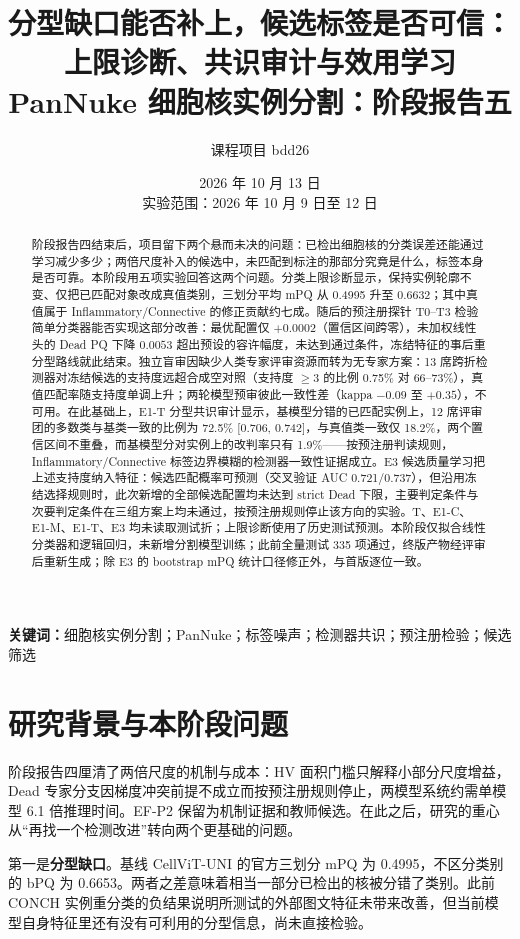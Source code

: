 \documentclass[11pt,a4paper,UTF8,fontset=fandol]{ctexart}
\title{\bfseries 分型缺口能否补上，候选标签是否可信：上限诊断、共识审计与效用学习\\[7pt]
\large PanNuke 细胞核实例分割：阶段报告五}
\author{课程项目 bdd26}
\date{2026 年 10 月 13 日\\\small 实验范围：2026 年 10 月 9 日至 12 日}
\begin{document}
\maketitle

\begin{abstract}
阶段报告四结束后，项目留下两个悬而未决的问题：已检出细胞核的分类误差还能通过学习减少多少；两倍尺度补入的候选中，未匹配到标注的那部分究竟是什么，标签本身是否可靠。本阶段用五项实验回答这两个问题。分类上限诊断显示，保持实例轮廓不变、仅把已匹配对象改成真值类别，三划分平均 mPQ 从 0.4995 升至 0.6632；其中真值属于 Inflammatory/Connective 的修正贡献约七成。随后的预注册探针 T0--T3 检验简单分类器能否实现这部分改善：最优配置仅 $+0.0002$（置信区间跨零），未加权线性头的 Dead PQ 下降 $0.0053$ 超出预设的容许幅度，未达到通过条件，冻结特征的事后重分型路线就此结束。独立盲审因缺少人类专家评审资源而转为无专家方案：13 席跨折检测器对冻结候选的支持度远超合成空对照（支持度 $\geq$3 的比例 0.75\% 对 66--73\%），真值匹配率随支持度单调上升；两轮模型预审彼此一致性差（kappa $-0.09$ 至 $+0.35$），不可用。在此基础上，E1-T 分型共识审计显示，基模型分错的已匹配实例上，12 席评审团的多数类与基类一致的比例为 72.5\% [0.706, 0.742]，与真值类一致仅 18.2\%，两个置信区间不重叠，而基模型分对实例上的改判率只有 1.9\%——按预注册判读规则，Inflammatory/Connective 标签边界模糊的检测器一致性证据成立。E3 候选质量学习把上述支持度纳入特征：候选匹配概率可预测（交叉验证 AUC 0.721/0.737），但沿用冻结选择规则时，此次新增的全部候选配置均未达到 strict Dead 下限，主要判定条件与次要判定条件在三组方案上均未通过，按预注册规则停止该方向的实验。T、E1-C、E1-M、E1-T、E3 均未读取测试折；上限诊断使用了历史测试预测。本阶段仅拟合线性分类器和逻辑回归，未新增分割模型训练；此前全量测试 335 项通过，终版产物经评审后重新生成；除 E3 的 bootstrap mPQ 统计口径修正外，与首版逐位一致。
\end{abstract}
\noindent\textbf{关键词：}细胞核实例分割；PanNuke；标签噪声；检测器共识；预注册检验；候选筛选

\section{研究背景与本阶段问题}

阶段报告四厘清了两倍尺度的机制与成本\cite{reports}：HV 面积门槛只解释小部分尺度增益，Dead 专家分支因梯度冲突前提不成立而按预注册规则停止，两模型系统约需单模型 6.1 倍推理时间。EF-P2 保留为机制证据和教师候选。在此之后，研究的重心从“再找一个检测改进”转向两个更基础的问题。

第一是\textbf{分型缺口}。基线 CellViT-UNI 的官方三划分 mPQ 为 0.4995，不区分类别的 bPQ 为 0.6653。两者之差意味着相当一部分已检出的核被分错了类别。此前 CONCH 实例重分类的负结果\cite{structure}说明所测试的外部图文特征未带来改善，但当前模型自身特征里还有没有可利用的分型信息，尚未直接检验。
\end{document}

